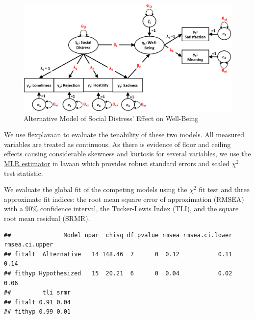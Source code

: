 \documentclass[
  english,
  doc]{apa6}
\begin{document}
\begin{figure}
\centering
\includegraphics{images/toolboxDiagramAlternative.png}
\caption{Alternative Model of Social Distress' Effect on Well-Being\label{fig:alternativeToolbox}}
\end{figure}

We use flexplavaan to evaluate the tenability of these two models. All measured variables are treated as continuous. As there is evidence of floor and ceiling effects causing considerable skewness and kurtosis for several variables, we use the \href{http://https://lavaan.ugent.be/tutorial/est.html}{MLR estimator} in lavaan which provides robust standard errors and scaled \(\chi^2\) test statistic.

We evaluate the global fit of the competing models using the \(\chi^2\) fit test and three approximate fit indices: the root mean square error of approximation (RMSEA) with a 90\% confidence interval, the Tucker-Lewis Index (TLI), and the square root mean residual (SRMR).

\begin{verbatim}
##               Model npar  chisq df pvalue rmsea rmsea.ci.lower rmsea.ci.upper
## fitalt  Alternative   14 148.46  7      0  0.12           0.11           0.14
## fithyp Hypothesized   15  20.21  6      0  0.04           0.02           0.06
##         tli srmr
## fitalt 0.91 0.04
## fithyp 0.99 0.01
\end{verbatim}
\end{document}
